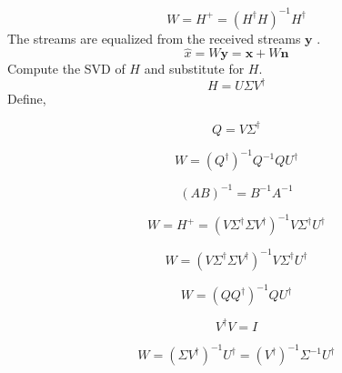\begin{equation} 
  W=H^{+}=(H^{\dagger} H)^{-1} H^{\dagger}
\end{equation}
The streams are equalized from the received streams $\textbf{y}$ .
\begin{equation} 
\hat{x}=W\textbf{y}=\textbf{x}+W\textbf{n}
\end{equation}
Compute the SVD of $H$ and substitute for  $H$.
\begin{equation} 
H=U\Sigma V^{\dagger}
\end{equation}
Define,

\begin{equation}
Q=V\Sigma^{\dagger}
\end{equation}

\begin{equation} 
W=(Q^{\dagger})^{-1}Q^{-1}QU^{\dagger}
\end{equation}

\begin{equation} 
(AB)^{-1}=B^{-1}A^{-1}
\end{equation}

\begin{equation} 
W=H^{+}=(V\Sigma^{\dagger}\Sigma V^{\dagger})^{-1}V\Sigma^{\dagger}U^{\dagger}
\end{equation}


\begin{equation}
W=(V\Sigma^{\dagger}\Sigma V^{\dagger})^{-1}V \Sigma^{\dagger}  U^{\dagger}
\end{equation}




\begin{equation}
W=(QQ^{\dagger})^{-1}QU^{\dagger}
\end{equation}


\begin{equation}
 V^{\dagger}V=I
\end{equation}




\begin{equation}
W=(\Sigma V^{\dagger})^{-1}U^{\dagger}=(V^{\dagger})^{-1}\Sigma^{-1}U^{\dagger}
\end{equation}




